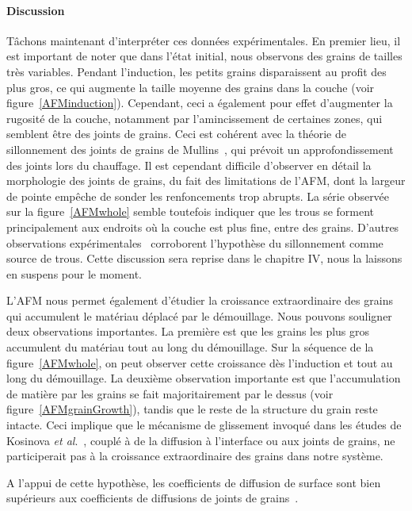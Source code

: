 \paragraph*{Discussion}
Tâchons maintenant d'interpréter ces données expérimentales. En premier lieu, il est important de noter que dans l'état initial, nous observons des grains de tailles très variables. Pendant l'induction, les petits grains disparaissent au profit des plus gros, ce qui augmente la taille moyenne des grains dans la couche (voir figure~\ref{AFMinduction}). Cependant, ceci a également pour effet d'augmenter la rugosité de la couche, notamment par l'amincissement de certaines zones, qui semblent être des joints de grains. Ceci est cohérent avec la théorie de sillonnement des joints de grains de Mullins~\cite{mullins1957theory}, qui prévoit un approfondissement des joints lors du chauffage. Il est cependant difficile d'observer en détail la morphologie des joints de grains, du fait des limitations de l'AFM, dont la largeur de pointe empêche de sonder les renfoncements trop abrupts. La série observée sur la figure~\ref{AFMwhole} semble toutefois indiquer que les trous se forment principalement aux endroits où la couche est plus fine, entre des grains. D'autres observations expérimentales~\cite{dannenberg2000situ} corroborent l'hypothèse du sillonnement comme source de trous. Cette discussion sera reprise dans le chapitre IV, nous la laissons en suspens pour le moment.\par 
L'AFM nous permet également d'étudier la croissance extraordinaire des grains qui accumulent le matériau déplacé par le démouillage. Nous pouvons souligner deux observations importantes. La première est que les grains les plus gros accumulent du matériau tout au long du démouillage. Sur la séquence de la figure~\ref{AFMwhole}, on peut observer cette croissance dès l'induction et tout au long du démouillage. La deuxième observation importante est que l'accumulation de matière par les grains se fait majoritairement par le dessus (voir figure~\ref{AFMgrainGrowth}), tandis que le reste de la structure du grain reste intacte. Ceci implique que le mécanisme de glissement invoqué dans les études de Kosinova \textit{et al}.~\cite{kosinova2014role}, couplé à de la diffusion à l'interface ou aux joints de grains, ne participerait pas à la croissance extraordinaire des grains dans notre système.\par
{}
A l'appui de cette hypothèse, les coefficients de diffusion de surface sont bien supérieurs aux coefficients de diffusions de joints de grains~\cite{heitjans2006diffusion}.

